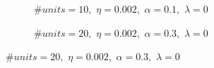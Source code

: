 \documentclass[11pt]{article}
\begin{document}
\begin{figure}[H]
    \centering
    \begin{subfigure}[b]{0.45\textwidth}
        \centering
        \vspace{-0.74cm}
         \caption{$\# units = 10,\,\, \eta = 0.002,\,\, \alpha = 0.1,\,\, \lambda = 0$}
         \label{fig:under_1}
    \end{subfigure}
    \hfill
    \begin{subfigure}[b]{0.45\textwidth}
        \centering
        \vspace{-0.74cm}
         \caption{$\# units = 20,\,\, \eta = 0.002,\,\, \alpha = 0.3,\,\, \lambda = 0$}
         \label{fig:under_2}

\end{subfigure}
\end{figure}
\end{document}
